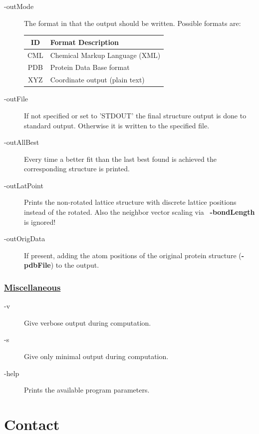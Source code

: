 \documentclass{article}
\begin{document}
\begin{description}
	\item[-outMode] The format in that the output should be written. Possible
	formats are: \newline
	\begin{minipage}{0.6\textwidth}
    \vspace{1em}
	\begin{tabular}{c|l}
    	ID & Format Description \\
    	\hline
    	CML & Chemical Markup Language (XML) \\
    	PDB & Protein Data Base format\\
    	XYZ & Coordinate output (plain text) 
    \end{tabular}
	\end{minipage}
	\item[-outFile] If not specified or set to 'STDOUT' the final structure output
	is done to standard output. Otherwise it is written to the specified file.
	\item[-outAllBest] Every time a better fit than the last best found is achieved
	the corresponding structure is printed.
	\item[-outLatPoint] Prints the non-rotated lattice structure with discrete
	lattice positions instead of the rotated. 
	 Also the neighbor vector scaling via \mbox{\bfseries
	\mbox{-bondLength}} is ignored!
	\item[-outOrigData] If present, adding the atom positions of the original
	protein structure ({\bfseries \mbox{-pdbFile}}) to the output.
\end{description}


\subsubsection*{\underline{ Miscellaneous }}

\begin{description}
	\item[-v] Give verbose output during computation.
	\item[-s] Give only minimal output during computation.
	\item[-help] Prints the available program parameters.
\end{description}


\section{Contact}
\end{document}
